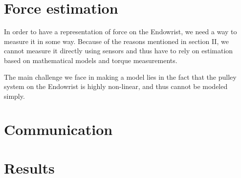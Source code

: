 \documentclass[conference]{IEEEtran}
\begin{document}
\section{Force estimation}
In order to have a representation of force on the Endowrist, we need a way to measure it in some way.
Because of the reasons mentioned in section II, we cannot measure it directly using sensors and thus have to rely on estimation based on 
mathematical models and torque measurements.

The main challenge we face in making a model lies in the fact that the pulley system on the Endowrist is highly non-linear, and thus cannot be modeled simply.

\section{Communication}
\section{Results}
%
%

\end{document}
